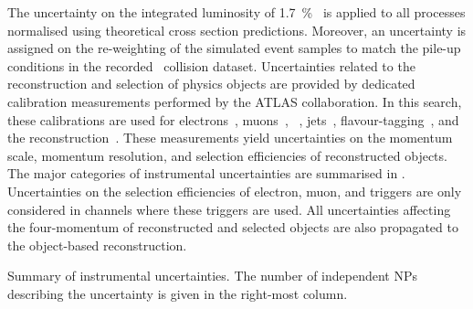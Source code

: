 The uncertainty on the integrated luminosity of
\SI{1.7}{\percent}~\cite{ATLAS-CONF-2019-021} is applied to all processes
normalised using theoretical cross section predictions. Moreover, an uncertainty
is assigned on the re-weighting of the simulated event samples to match the
pile-up conditions in the recorded \pp~collision dataset. Uncertainties related
to the reconstruction and selection of physics objects are provided by dedicated
calibration measurements performed by the ATLAS collaboration. In this search,
these calibrations are used for electrons~\cite{EGAM-2018-01,TRIG-2018-05},
muons~\cite{MUON-2018-03}, \tauhadvis~\cite{ATLAS-CONF-2017-029},
jets~\cite{JETM-2018-05},
flavour-tagging~\cite{FTAG-2018-01,FTAG-2020-08,FTAG-2021-002}, and the
\pTmissAbs reconstruction~\cite{ATLAS-CONF-2018-023}. These measurements yield
uncertainties on the momentum scale, momentum resolution, and selection
efficiencies of reconstructed objects. The major categories of instrumental
uncertainties are summarised in
. Uncertainties on the selection
efficiencies of electron, muon, and \tauhadvis triggers are only considered in
channels where these triggers are used. All uncertainties affecting the
four-momentum of reconstructed and selected objects are also propagated to the
object-based \pTmissAbs reconstruction.


\begin{table}[htbp]
  \centering

  \caption[Summary of instrumental uncertainties.]{Summary of instrumental
    uncertainties. The number of independent NPs describing the uncertainty is
    given in the right-most column.}%
  \label{tab:experimental_uncertainties_2}

  { \renewcommand{\arraystretch}{1.5}  }
\end{table}

